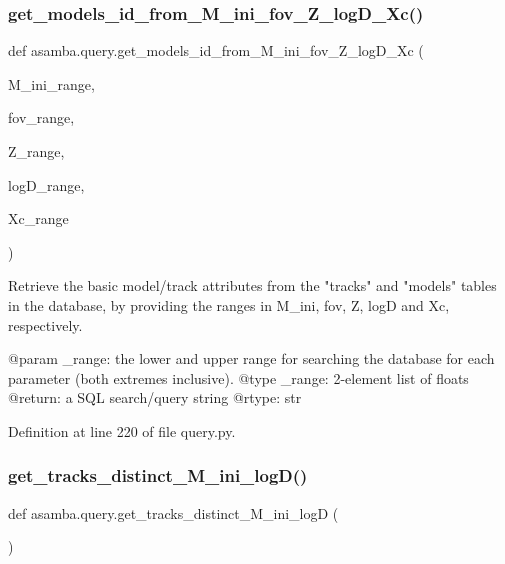 \subsubsection{\texorpdfstring{get\+\_\+models\+\_\+id\+\_\+from\+\_\+\+M\+\_\+ini\+\_\+fov\+\_\+\+Z\+\_\+log\+D\+\_\+\+Xc()}{get\_models\_id\_from\_M\_ini\_fov\_Z\_logD\_Xc()}}
{\footnotesize\ttfamily def asamba.\+query.\+get\+\_\+models\+\_\+id\+\_\+from\+\_\+\+M\+\_\+ini\+\_\+fov\+\_\+\+Z\+\_\+log\+D\+\_\+\+Xc (\begin{DoxyParamCaption}\item[{}]{M\+\_\+ini\+\_\+range,  }\item[{}]{fov\+\_\+range,  }\item[{}]{Z\+\_\+range,  }\item[{}]{log\+D\+\_\+range,  }\item[{}]{Xc\+\_\+range }\end{DoxyParamCaption})}

\begin{DoxyVerb}Retrieve the basic model/track attributes from the "tracks" and "models" tables in the database,
by providing the ranges in M_ini, fov, Z, logD and Xc, respectively.  

@param _range: the lower and upper range for searching the database for each parameter (both extremes
       inclusive).
@type _range: 2-element list of floats
@return: a SQL search/query string
@rtype: str
\end{DoxyVerb}
 

Definition at line 220 of file query.\+py.

\mbox{\label{namespaceasamba_1_1query_a57abe0b932be64cd2b91fc056a377143}} 
\subsubsection{\texorpdfstring{get\+\_\+tracks\+\_\+distinct\+\_\+\+M\+\_\+ini\+\_\+log\+D()}{get\_tracks\_distinct\_M\_ini\_logD()}}
{\footnotesize\ttfamily def asamba.\+query.\+get\+\_\+tracks\+\_\+distinct\+\_\+\+M\+\_\+ini\+\_\+logD (\begin{DoxyParamCaption}{ }\end{DoxyParamCaption})}

